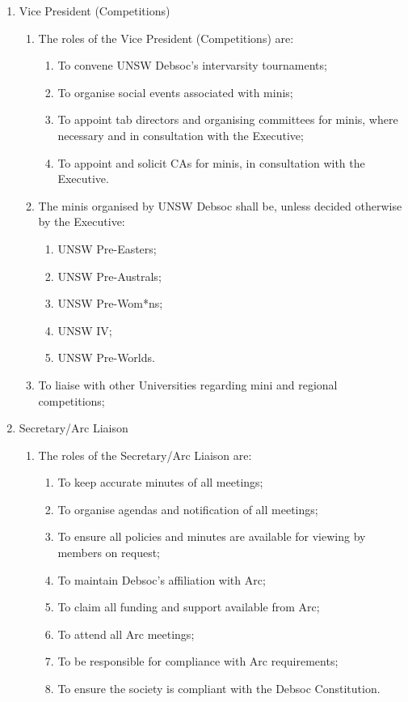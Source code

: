 \begin{enumerate}
\item Vice President (Competitions)
  \begin{enumerate}
  \item The roles of the Vice President (Competitions) are:
    \begin{enumerate}
    \item To convene UNSW Debsoc’s intervarsity tournaments;
    \item To organise social events associated with minis;
    \item To appoint tab directors and organising committees for minis, where necessary and in consultation with the Executive;
    \item To appoint and solicit CAs for minis, in consultation with the Executive.
    \end{enumerate}
  \item The minis organised by UNSW Debsoc shall be, unless decided otherwise by the Executive:
    \begin{enumerate}
    \item UNSW Pre-Easters;
    \item UNSW Pre-Australs;
    \item UNSW Pre-Wom*ns;
    \item UNSW IV;
    \item UNSW Pre-Worlds.
    \end{enumerate}
  \item To liaise with other Universities regarding mini and regional competitions;
  \end{enumerate}

\item Secretary/Arc Liaison
  \begin{enumerate}
  \item The roles of the Secretary/Arc Liaison are:
    \begin{enumerate}
    \item To keep accurate minutes of all meetings;
    \item To organise agendas and notification of all meetings;
    \item To ensure all policies and minutes are available for viewing by members on request;
    \item To maintain Debsoc’s affiliation with Arc;
    \item To claim all funding and support available from Arc;
    \item To attend all Arc meetings;
    \item To be responsible for compliance with Arc requirements;
    \item To ensure the society is compliant with the Debsoc Constitution.
    \end{enumerate}
  \end{enumerate}


\end{enumerate}
